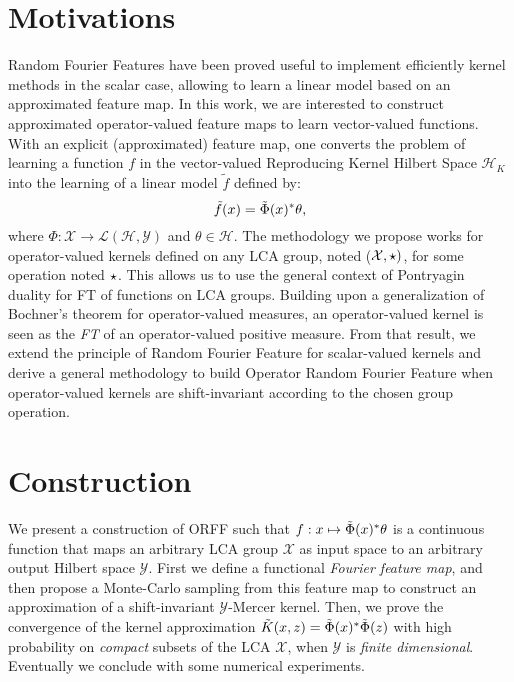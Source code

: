 \section{Motivations}
\label{sec:motivations}
Random Fourier Features have been proved useful to implement efficiently kernel methods in the scalar case, allowing to learn a linear model based on an approximated feature map. In this work, we are interested to construct approximated operator-valued feature maps to learn vector-valued functions. With an explicit (approximated) feature map, one converts the problem of learning a function $f$ in the vector-valued Reproducing Kernel Hilbert Space $\mathcal{H}_K$ into the learning of a linear model $\tilde{f}$ defined by:
 \begin{equation*}
 \tilde{f}(x) = \tilde{\Phi}(x)^* \theta,
 \end{equation*}
 where $\Phi: \mathcal{X} \to \mathcal{L}(\mathcal{H},\mathcal{Y})$ and $\theta \in \mathcal{H}$. The methodology we propose works for operator-valued kernels defined on any \acf{LCA} group, noted ($\mathcal{X}, \star)$, for some operation noted $\star$. This allows us to use the general context of Pontryagin duality for \acl{FT} of functions on \acs{LCA} groups. Building upon a generalization of Bochner's theorem for operator-valued measures, an operator-valued kernel is seen as the \emph{\acl{FT}} of an operator-valued positive measure. From that result, we extend the principle of Random Fourier Feature for scalar-valued kernels and derive a general methodology to build Operator Random Fourier Feature when operator-valued kernels are shift-invariant according to the chosen group operation.

\section{Construction}
\label{sec:construction}
We present a construction of \acf{ORFF} such that $f: x\mapsto \tilde{\Phi}(x)^*\theta$ is a continuous function that maps an arbitrary \acs{LCA} group $\mathcal{X}$ as input space to an arbitrary output Hilbert space $\mathcal{Y}$. First we define a functional \emph{Fourier feature map}, and then propose a Monte-Carlo sampling from this feature map to construct an approximation of a shift-invariant $\mathcal{Y}$-Mercer kernel.
Then, we prove the convergence of the kernel approximation $\tilde{K}(x,z)=\tilde{\Phi}(x)^*\tilde{\Phi}(z)$ with high probability on \emph{compact} subsets of the \acs{LCA} $\mathcal{X}$, when $\mathcal{Y}$ is \emph{finite dimensional}. Eventually we conclude with some numerical experiments.
